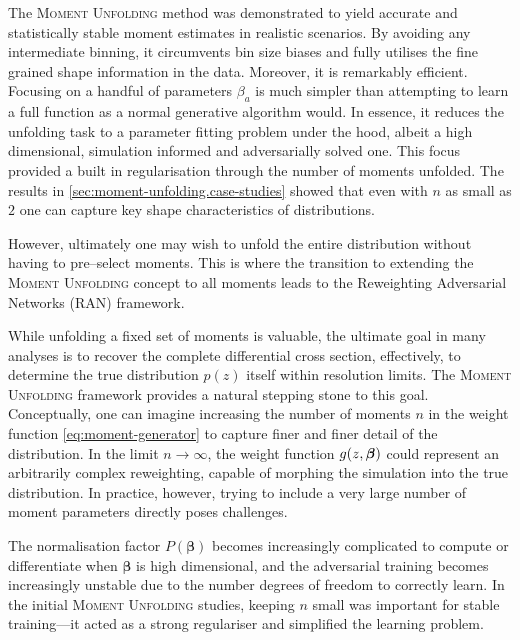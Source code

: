 {{        The \textsc{Moment Unfolding} method was demonstrated to yield accurate and statistically stable moment estimates in realistic scenarios.
        By avoiding any intermediate binning, it circumvents bin size biases and fully utilises the fine grained shape information in the data.
        Moreover, it is remarkably efficient.
        Focusing on a handful of parameters $\beta_a$ is much simpler than attempting to learn a full function as a normal generative algorithm would.
        In essence, it reduces the unfolding task to a parameter fitting problem under the hood, albeit a high dimensional, simulation informed and adversarially solved one. This focus provided a built in regularisation through the number of moments unfolded.
        The results in \cref{sec:moment-unfolding.case-studies} showed that even with $n$ as small as \(2\) one can capture key shape characteristics of distributions.
        
        However, ultimately one may wish to unfold the entire distribution without having to pre--select moments.
        This is where the transition to extending the \textsc{Moment Unfolding} concept to all moments leads to the Reweighting Adversarial Networks (RAN) framework.

        While unfolding a fixed set of moments is valuable, the ultimate goal in many analyses is to recover the complete differential cross section, effectively, to determine the true distribution $p(z)$ itself within resolution limits.
        The \textsc{Moment Unfolding} framework provides a natural stepping stone to this goal. Conceptually, one can imagine increasing the number of moments $n$ in the weight function \cref{eq:moment-generator} to capture finer and finer detail of the distribution.
        In the limit $n \to \infty$, the weight function $g(z, \vb*\beta)$ could represent an arbitrarily complex reweighting, capable of morphing the simulation into the true distribution.
        In practice, however, trying to include a very large number of moment parameters directly poses challenges.
        
        The normalisation factor $P(\boldsymbol{\beta})$ becomes increasingly complicated to compute or differentiate when $\boldsymbol{\beta}$ is high dimensional, and the adversarial training becomes increasingly unstable due to the number degrees of freedom to correctly learn.
        In the initial \textsc{Moment Unfolding} studies, keeping $n$ small was important for stable training---it acted as a strong regulariser and simplified the learning problem.
        
}}
